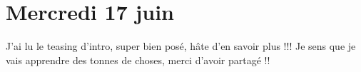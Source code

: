 \section*{Mercredi 17 juin}

\begin{leftbubbles}
J'ai lu le teasing d'intro, super bien posé, hâte d'en savoir plus !!!   Je sens que je vais apprendre des tonnes de choses, merci d'avoir partagé !!\\
\end{leftbubbles}